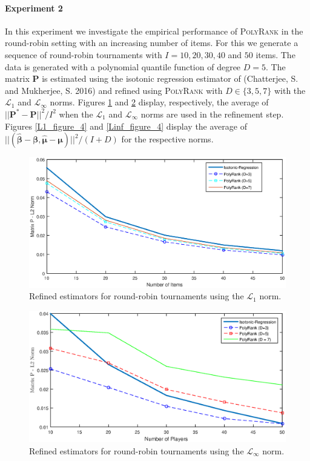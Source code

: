 \documentclass[twoside,11pt]{article}
\begin{document}
\paragraph{Experiment 2}  In this experiment we investigate the empirical performance of  \textsc{PolyRank} in the round-robin setting with an increasing number of items. For this we generate a sequence of round-robin tournaments with  $I = 10, 20, 30, 40$ and $50$ items. The data is generated with a polynomial quantile function of degree $D=5$. The matrix $\boldsymbol{P}$ is estimated using the isotonic regression estimator of (Chatterjee, S. and  Mukherjee, S. 2016) and refined using  \textsc{PolyRank} with $D \in \{3,5,7\}$ with the $\mathcal{L}_1$ and $\mathcal{L}_{\infty}$ norms.  Figures \ref{L1_figure_3} and \ref{Linf_figure_3} display, respectively, the average of $||\boldsymbol{P}^* - \boldsymbol{P}||^2/I^2$ when the $\mathcal{L}_1$ and $\mathcal{L}_{\infty}$ norms are used in the refinement step. Figures \ref{L1_figure_4} and \ref{Linf_figure_4} display the average of $||(\boldsymbol{\hat{\beta}} -\boldsymbol{\beta}, \boldsymbol{\hat{\mu}} -\boldsymbol{\mu})||^2/(I+D)$ for the respective norms.

\begin{figure}
  \centering
    \includegraphics[width=1\textwidth]{L1_figure_3}
    \caption{Refined estimators for round-robin tournaments using the $\mathcal{L}_1$ norm. \label{L1_figure_3}}
\end{figure}

\begin{figure}
  \centering
    \includegraphics[width=1\textwidth]{Linf_figure_3}
    \caption{Refined estimators for round-robin tournaments using the $\mathcal{L}_{\infty}$ norm. \label{Linf_figure_3}}
\end{figure}
\end{document}
